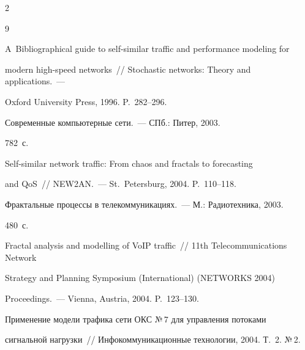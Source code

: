 \begin{multicols}{2}
{\small\frenchspacing

{%


\begin{thebibliography}{9}





A~Bibliographical guide to self-similar traffic and performance modeling for 

modern high-speed networks~// Stochastic networks: Theory and applications.~--- 

Oxford University Press, 1996. P.~282--296.




 Современные компьютерные сети.~--- СПб.: Питер, 2003. 

782~с.




 Self-similar network traffic: From chaos and fractals to forecasting 

and QoS~// NEW2AN.~--- St.\ Petersburg, 2004. P.~110--118.





Фрактальные процессы в телекоммуникациях.~--- М.: Радиотехника, 2003. 

480~с.





Fractal analysis and modelling of VoIP traffic~// 11th  Telecommunications Network 

Strategy and Planning Symposium (International) (NETWORKS 2004) 

Proceedings.~--- Vienna, Austria, 2004. P.~123--130.





Применение модели трафика сети ОКС №\,7 для управления потоками 

сигнальной нагрузки~// Инфокоммуникационные технологии, 2004. Т.~2. №\,2. 


\end{thebibliography}}}
\end{multicols}
